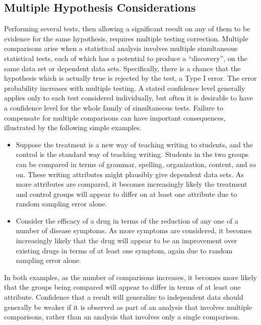\documentclass[12pt]{article}
\begin{document}
\subsection*{Multiple Hypothesis Considerations}

Performing several tests, then allowing a significant result on any of
them to be evidence for the same hypothesis, requires multiple testing
correction.  Multiple comparisons%
arise when a statistical analysis involves multiple simultaneous
statistical tests, each of which has a potential to produce a
``discovery'', on the same data set or dependent data sets.
Specifically, there is a chance that the hypothesis which is actually
true is rejected by the test, a Type I error.  The error probability
increases with multiple testing.  A stated confidence level generally
applies only to each test considered individually, but often it is
desirable to have a confidence level for the whole family of
simultaneous tests.  Failure to compensate for multiple comparisons can
have important consequences, illustrated by the following simple
examples.
\begin{itemize}
    \item
        Suppose the treatment is a new way of teaching writing to
        students, and the control is the standard way of teaching
        writing.  Students in the two groups can be compared in terms of
        grammar, spelling, organization, content, and so on.  These
        writing attributes might plausibly give dependent data sets.  As
        more attributes are compared, it becomes increasingly likely the
        treatment and control groups will appear to differ on at least
        one attribute due to random sampling error alone.
    \item
        Consider the efficacy of a drug in terms of the reduction of any
        one of a number of disease symptoms.  As more symptoms are
        considered, it becomes increasingly likely that the drug will
        appear to be an improvement over existing drugs in terms of at
        least one symptom, again due to random sampling error alone.
\end{itemize}
In both examples, as the number of comparisons increases, it becomes
more likely that the groups being compared will appear to differ in
terms of at least one attribute.  Confidence that a result will
generalize to independent data should generally be weaker if it is
observed as part of an analysis that involves multiple comparisons,
rather than an analysis that involves only a single comparison.
\end{document}
